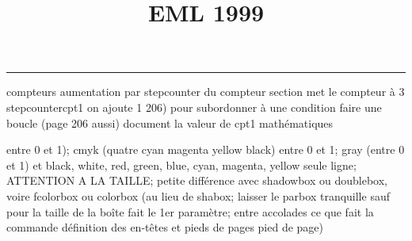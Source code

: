 \documentclass[11pt]{article}%
\title{\bf \vspace{-2cm} EML 1999} %
\author{} %
\date{} %
\renewcommand{\headrulewidth}{0pt}%
\renewcommand{\footrulewidth}{0.4pt}%
\begin{document}
\maketitle %
\vspace{-1.4cm}\hrule %
\thispagestyle{fancy}

\vspace*{.2cm}



compteurs%
aumentation par stepcounter du compteur section%
met le compteur à 3%
stepcounter{cpt1} on ajoute 1%
206) pour subordonner à une condition %
faire une boucle (page 206 aussi) %
document la valeur de cpt1 
mathématiques\newcommand{\ch}{\operatorname{ch}} 
\newcommand{\sh}{\operatorname{sh}}
\renewcommand{\tanh}{\operatorname{th}}
\renewcommand{\sinh}{\operatorname{sh}}
\renewcommand{\cosh}{\operatorname{ch}}
\newcommand{\argsh}{\operatorname{argsh}}
\newcommand{\argch}{\operatorname{argch}}
\newcommand{\argth}{\operatorname{argth}}
\newcommand{\ker}{\operatorname{Ker}}
\renewcommand{\im}{\operatorname{Im}}
\newcommand{\rg}{\operatorname{rg}}
\newcommand{\Id}{\operatorname{Id}}
\newcommand{\id}{\operatorname{id}}
\renewcommand{\leq}{\leq}
\renewcommand{\geq}{\geq }

entre 0 et 1); cmyk (quatre cyan magenta yellow black) entre 0 et 1;
gray (entre 0 et 1) et black, white, red, green, blue, cyan, magenta,
yellow%
seule ligne; ATTENTION A LA TAILLE; petite différence avec shadowbox ou
doublebox, voire fcolorbox ou colorbox (au lieu de shabox; laisser le
parbox tranquille sauf pour la taille de la boîte
\newcommand{\Tbox}[1]{\begin{center} \shabox{\parbox{0.6
\linewidth}{#1}} \end{center}} %
fait le 1er paramètre; entre accolades ce que fait la commande
définition des en-têtes et pieds de pages\pagestyle{fancy}
\chead{}
\rfoot[ \ \thepage]{\thepage}
\cfoot{}
\lfoot{}
\thispagestyle{fancy} %
pied de page)\renewcommand{\footrulewidth}{0.4pt}
\renewcommand{\headrulewidth}{0.4pt}
\end{document}

